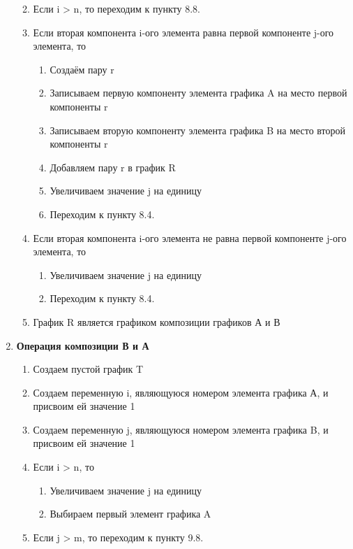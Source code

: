 \documentclass[a4paper,12pt]{extarticle}
\begin{document}
\begin{enumerate}
\begin{enumerate}[label*=\arabic*.]
\begin{enumerate}[label*=\arabic*.]
        \end{enumerate}
    \item Если i > n, то переходим к пункту 8.8.
    \item Если вторая компонента i-ого элемента равна первой компоненте j-ого элемента, то
        \begin{enumerate}[label*=\arabic*.]
            \item Создаём пару r
            \item Записываем первую компоненту элемента графика A на место первой компоненты r
            \item Записываем вторую компоненту элемента графика B на место второй компоненты r
            \item Добавляем пару r в график R
            \item Увеличиваем значение j на единицу
            \item Переходим к пункту 8.4.
        \end{enumerate}
    \item Если вторая компонента i-ого элемента не равна первой компоненте j-ого элемента, то
        \begin{enumerate}[label*=\arabic*.]
            \item Увеличиваем значение j на единицу
            \item Переходим к пункту 8.4.
        \end{enumerate}
    \item График R является графиком композиции графиков А и В
    \end{enumerate}
  \item \textbf{Операция композиции В и А}
    \begin{enumerate}[label*=\arabic*.]
        \item Создаем пустой график T
        \item Создаем переменную i, являющуюся номером элемента графика А, и присвоим ей значение 1
        \item Создаем переменную j, являющуюся номером элемента графика B, и присвоим ей значение 1
        \item Если i > n, то
        \begin{enumerate}[label*=\arabic*.]
            \item Увеличиваем значение j на единицу
            \item Выбираем первый элемент графика A
        \end{enumerate}
        \item Если j > m, то переходим к пункту 9.8.

\end{enumerate}
\end{enumerate}
\end{document}
